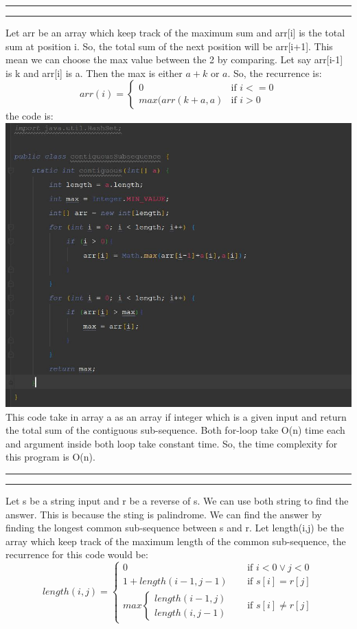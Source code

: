 \documentclass[a4paper, 11pt]{article}
\newcommand{\question}[2] {\vspace{.25in} \hrule\vspace{0.5em}
\noindent{\bf #1: #2} \vspace{0.5em}
\hrule \vspace{.10in}}
\begin{document}
\question{2}{Problem2}
Let arr be an array which keep track of the maximum sum and arr[i] is the total sum at position i. So, the total sum of the next position will be arr[i+1]. This mean we can choose the max value between the 2 by comparing. Let say arr[i-1] is k and arr[i] is a. Then the max is either $a+k$ or $a$. So, the recurrence is:\\
\[
arr(i)= 
\begin{cases}
0 & \text{if } i <= 0\\
max(arr(k+a, a)& \text{if } i > 0
\end{cases}
\]
the code is:\\
\includegraphics[width=\textwidth]{cs.jpg}\\
This code take in array a as an array if integer which is a given input and return the total sum of the contiguous sub-sequence. Both for-loop take O(n) time each and argument inside both loop take constant time. So, the time complexity for this program is O(n).
\question{3}{Problem3}
Let s be a string input and r be a reverse of s. We can use both string to find the answer. This is because the sting is palindrome. We can find the answer by finding the longest common sub-sequence between s and r. Let length(i,j) be the array which keep track of the maximum length of the common sub-sequence, the recurrence for this code would be:
\[
length(i,j) = 
\begin{cases}
0       & \quad \text{if } i<0 \lor j<0 \\
1+length(i-1,j-1)   & \quad \text{if } s[i] = r[j]\\
max\begin{cases}
length(i-1,j)\\
length(i,j-1)
\end{cases}     & \quad \text{if } s[i] \neq r[j]
\end{cases}
\]
\end{document}
